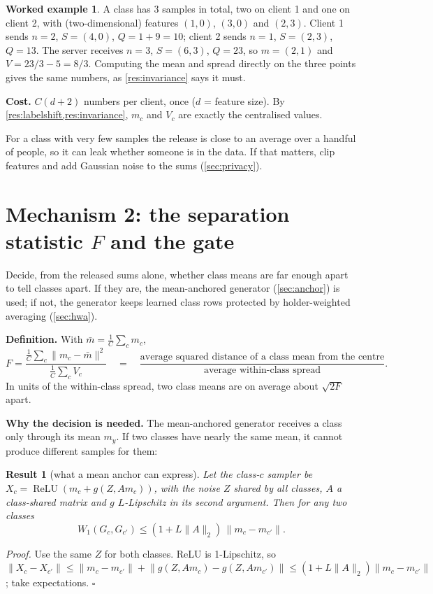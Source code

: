 \documentclass[11pt]{article}
\theoremstyle{plain}
\newtheorem{result}{Result}
\theoremstyle{definition}
\newtheorem{example}{Worked example}
\newcommand{\norm}[1]{\lVert #1\rVert}
\newcommand{\ReLU}{\operatorname{ReLU}}
\begin{document}
\begin{example}
A class has 3 samples in total, two on client 1 and one on client 2, with (two-dimensional) features $(1,0)$, $(3,0)$
and $(2,3)$. Client 1 sends $n=2$, $S=(4,0)$, $Q=1+9=10$; client 2 sends $n=1$, $S=(2,3)$, $Q=13$. The server receives
$n=3$, $S=(6,3)$, $Q=23$, so $m=(2,1)$ and $V=23/3-5=8/3$. Computing the mean and spread directly on the three points
gives the same numbers, as \cref{res:invariance} says it must.
\end{example}

\textbf{Cost.} $C(d+2)$ numbers per client, once ($d$ = feature size). By \cref{res:labelshift,res:invariance},
$m_c$ and $V_c$ are exactly the centralised values.

\begin{caveat}
For a class with very few samples the release is close to an average over a handful of people, so it can leak
whether someone is in the data. If that matters, clip features and add Gaussian noise to the sums
(\cref{sec:privacy}).
\end{caveat}

\section{Mechanism 2: the separation statistic $F$ and the gate}\label{sec:gate}

\begin{purpose}
Decide, from the released sums alone, whether class means are far enough apart to tell classes apart. If they are,
the mean-anchored generator (\cref{sec:anchor}) is used; if not, the generator keeps learned class rows protected by
holder-weighted averaging (\cref{sec:hwa}).
\end{purpose}

\textbf{Definition.} With $\bar m=\frac1C\sum_cm_c$,
\[
F=\frac{\frac1C\sum_c\norm{m_c-\bar m}^2}{\frac1C\sum_cV_c}
\quad=\quad\frac{\text{average squared distance of a class mean from the centre}}{\text{average within-class spread}} .
\]
In units of the within-class spread, two class means are on average about $\sqrt{2F}$ apart.

\textbf{Why the decision is needed.} The mean-anchored generator receives a class only through its mean $m_y$. If two
classes have nearly the same mean, it cannot produce different samples for them:

\begin{result}[what a mean anchor can express]\label{res:w1}
Let the class-$c$ sampler be $X_c=\ReLU(m_c+g(Z,Am_c))$, with the noise $Z$ shared by all classes, $A$ a class-shared
matrix and $g$ $L$-Lipschitz in its second argument. Then for any two classes
\[
W_1(G_c,G_{c'})\le(1+L\norm{A}_2)\,\norm{m_c-m_{c'}} .
\]
\end{result}
\emph{Proof.} Use the same $Z$ for both classes. ReLU is 1-Lipschitz, so
$\norm{X_c-X_{c'}}\le\norm{m_c-m_{c'}}+\norm{g(Z,Am_c)-g(Z,Am_{c'})}\le(1+L\norm A_2)\norm{m_c-m_{c'}}$; take
expectations. $\square$
\end{document}
